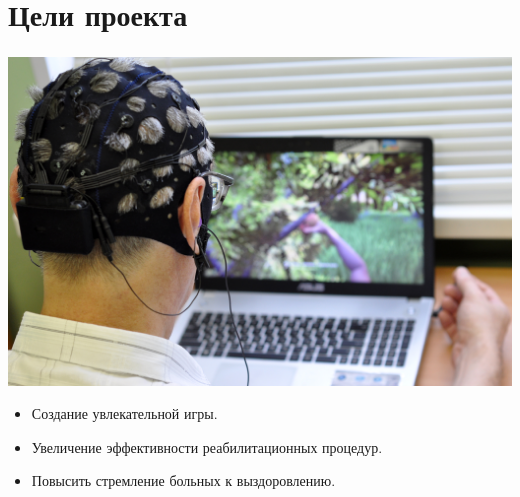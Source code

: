 \section{Цели проекта}

\begin{frame}
    \frametitle{\insertsection} 
    \framesubtitle{\insertsubsection}
    
    \begin{minipage}[h]{0.4\linewidth}
        \includegraphics[width=\linewidth]{5.jpg}
    \end{minipage}
    \hfill 
    \begin{minipage}[h]{0.5\linewidth}
    \begin{itemize}
        \item Создание увлекательной игры.
        \item Увеличение эффективности реабилитационных процедур.
        \item Повысить стремление больных к выздоровлению.
    \end{itemize}
    \end{minipage}

\end{frame}